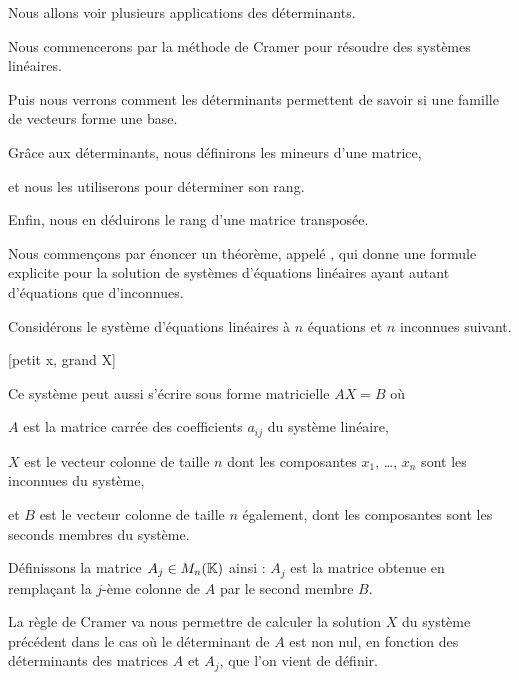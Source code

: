 







\debuttexte


\diapo
\change
Nous allons voir plusieurs applications des déterminants.

\change
Nous commencerons par la méthode de Cramer pour résou\-dre des systèmes linéaires.

\change
Puis nous verrons comment les déterminants permettent de savoir si une famille de vecteurs forme une base.

\change
Grâce aux déterminants, nous définirons les mineurs d'une matrice, 

\change
et nous les utiliserons pour déterminer son rang.

\change
Enfin, nous en déduirons le rang d'une matrice transposée.

\diapo
Nous commençons par énoncer un théorème, appelé , qui donne une 
formule explicite pour la solution de systèmes d'équations linéaires 
ayant autant d'équa\-tions que d'inconnues. 

Considérons le système d'équations linéaires à $n$ équations et $n$ inconnues suivant.

\change

[petit x, grand X]

Ce système peut aussi s'écrire sous forme matricielle $AX=B$ où 

\change
$A$ est la matrice carrée des coefficients $a_{ij}$ du système linéaire, 

\change
$X$ est le vecteur colonne de taille $n$ dont les composantes $x_1$, \ldots, $x_n$ sont les inconnues du système, 

\change
et $B$ est le vecteur colonne de taille $n$ également, dont les composantes sont les seconds membres du système.

\change
Définissons la matrice $A_j \in M_{n}(\mathbb{K})$ ainsi : $A_j$ est la matrice obtenue en remplaçant la $j$-ème colonne de $A$ par le second membre $B$. 

\diapo

La règle de Cramer va nous permettre de calculer la solution $X$ du système précédent dans le cas où le déterminant de $A $ est non nul, en fonction des déterminants des matrices $A$ et $A_j$, que l'on vient de définir. \\

